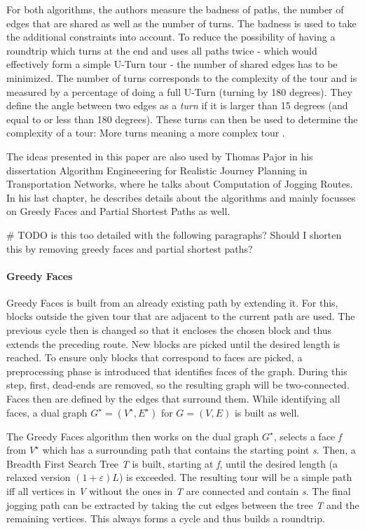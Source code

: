 For both algorithms, the authors measure the badness of paths, the number of edges that are shared as well as the number of turns.
The badness is used to take the additional constraints into account. 
To reduce the possibility of having a roundtrip which turns at the end and uses all paths twice - which would effectively form a simple U-Turn tour - the number of shared edges has to be minimized.
The number of turns corresponds to the complexity of the tour and is measured by a percentage of doing a full U-Turn (turning by 180 degrees). 
They define the angle between two edges as a \textit{turn} if it is larger than 15 degrees (and equal to or less than 180 degrees).
These turns can then be used to determine the complexity of a tour:
More turns meaning a more complex tour \cite{gemsa_efficient_2013}.

The ideas presented in this paper are also used by Thomas Pajor in his dissertation \glqq Algorithm Engineeering for Realistic Journey Planning in Transportation Networks\grqq \cite{pajor_algorithm_2013}, where he talks about Computation of Jogging Routes. In his last chapter, he describes details about the algorithms and mainly focusses on Greedy Faces and Partial Shortest Paths as well.

\# TODO is this too detailed with the following paragraphs? Should I shorten this by removing greedy faces and partial shortest paths?


\paragraph{Greedy Faces}

Greedy Faces is built from an already existing path by extending it.
For this, blocks outside the given tour that are adjacent to the current path are used.
The previous cycle then is changed so that it encloses the chosen block and thus extends the preceding route. 
New blocks are picked until the desired length is reached.
To ensure only blocks that correspond to faces are picked, a preprocessing phase is introduced that identifies faces of the graph.
During this step, first, dead-ends are removed, so the resulting graph will be two-connected.
Faces then are defined by the edges that surround them. 
While identifying all faces, a dual graph $G^{\star} = (V^{\star},E^{\star})$ for $G = (V,E)$ is built as well.

The Greedy Faces algorithm then works on the dual graph $G^{\star}$, selects a face \textit{f} from $V^{\star}$ which has a surrounding path that contains the starting point \textit{s}. 
Then, a Breadth First Search Tree \textit{T} is built, starting at \textit{f}, until the desired length (a relaxed version $(1 + \varepsilon) L$) is exceeded.
The resulting tour will be a simple path iff all vertices in \textit{V} without the ones in \textit{T} are connected and contain \textit{s}.
The final jogging path can be extracted by taking the cut edges between the tree \textit{T} and the remaining vertices.
This always forms a cycle and thus builds a roundtrip.


